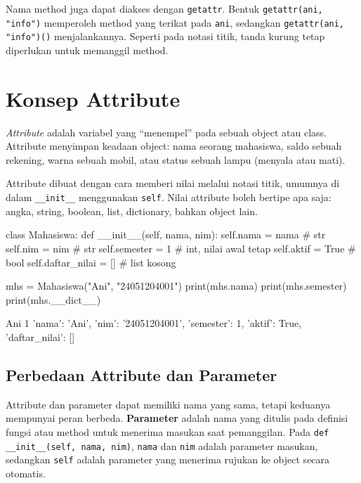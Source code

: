 Nama method juga dapat diakses dengan \texttt{getattr}. Bentuk \texttt{getattr(ani, "info")} memperoleh method yang terikat pada \texttt{ani}, sedangkan \texttt{getattr(ani, "info")()} menjalankannya. Seperti pada notasi titik, tanda kurung tetap diperlukan untuk memanggil method.

\section{Konsep Attribute}

\emph{Attribute} adalah variabel yang ``menempel'' pada sebuah object atau class. Attribute menyimpan keadaan object: nama seorang mahasiswa, saldo sebuah rekening, warna sebuah mobil, atau status sebuah lampu (menyala atau mati).

Attribute dibuat dengan cara memberi nilai melalui notasi titik, umumnya di dalam \texttt{\_\_init\_\_} menggunakan \texttt{self}. Nilai attribute boleh bertipe apa saja: angka, string, boolean, list, dictionary, bahkan object lain.

\begin{kode}
class Mahasiswa:
    def __init__(self, nama, nim):
        self.nama = nama          # str
        self.nim = nim            # str
        self.semester = 1         # int, nilai awal tetap
        self.aktif = True         # bool
        self.daftar_nilai = []    # list kosong

mhs = Mahasiswa("Ani", "24051204001")
print(mhs.nama)
print(mhs.semester)
print(mhs.__dict__)
\end{kode}

\begin{keluaran}
Ani
1
{'nama': 'Ani', 'nim': '24051204001', 'semester': 1, 'aktif': True, 'daftar_nilai': []}
\end{keluaran}

\subsection{Perbedaan Attribute dan Parameter}

Attribute dan parameter dapat memiliki nama yang sama, tetapi keduanya mempunyai peran berbeda. \textbf{Parameter} adalah nama yang ditulis pada definisi fungsi atau method untuk menerima masukan saat pemanggilan. Pada \texttt{def \_\_init\_\_(self, nama, nim)}, \texttt{nama} dan \texttt{nim} adalah parameter masukan, sedangkan \texttt{self} adalah parameter yang menerima rujukan ke object secara otomatis.

